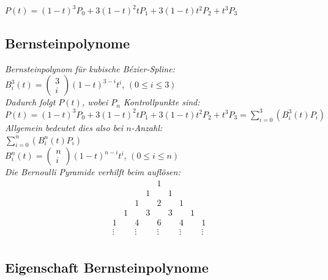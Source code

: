 $P(t) = (1 - t)^3P_0 + 3(1 - t)^2tP_1 + 3(1 - t)t^2P_2 + t^3P_3$

\subsection{Bernsteinpolynome}

\textit{Bernsteinpolynom für kubische Bézier-Spline:}\\
$B^3_i(t) = \left(\begin{matrix}
    3 \\ i
\end{matrix}\right) (1-t)^{3-i}t^i$, $(0 \leq i \leq 3)$\\

\textit{Dadurch folgt $P(t)$, wobei $P_n$ Kontrollpunkte sind:} \\
$P(t) = (1 - t)^3P_0 + 3(1 - t)^2tP_1 + 3(1 - t)t^2P_2 + t^3P_3 = \displaystyle \sum_{i=0}^{3}( B_i^3(t) P_i )$ \\

\textit{Allgemein bedeutet dies also bei $n$-Anzahl:}\\
$\displaystyle \sum^n_{i=0}(B^n_i(t)P_i)$\\
$B_i^n(t) = \left(\begin{matrix}
    n \\ i
\end{matrix}\right) (1 - t)^{n-i}t^i$, $(0 \leq i \leq n)$\\

\textit{Die Bernoulli Pyramide verhilft beim auflösen:}\\
\[
    \begin{matrix}
          &   &   &   & 1 &   &   &   & \\
          &   &   & 1 &   & 1 &   &   & \\
          &   & 1 &   & 2 &   & 1 &   & \\
          & 1 &   & 3 &   & 3 &   & 1 & \\
        1 &   & 4 &   & 6 &   & 4 &   & 1 \\
      \vdots&&\vdots&&\vdots&&\vdots&&\vdots \\
    \end{matrix}
\]

\subsection{Eigenschaft Bernsteinpolynome}

